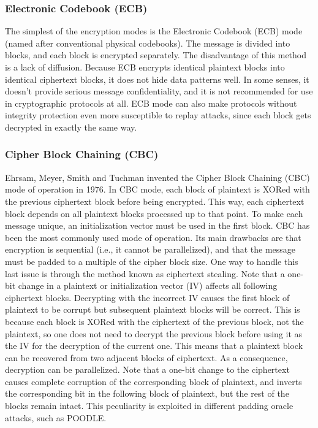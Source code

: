 \documentclass[a4paper, 10pt, titlepage]{article}
\begin{document}
\subsubsection*{Electronic Codebook (ECB)}
The simplest of the encryption modes is the Electronic Codebook (ECB) mode (named after conventional physical codebooks). The message is divided into blocks, and each block is encrypted separately.
The disadvantage of this method is a lack of diffusion. Because ECB encrypts identical plaintext blocks into identical ciphertext blocks, it does not hide data patterns well. In some senses, it doesn't provide serious message confidentiality, and it is not recommended for use in cryptographic protocols at all. ECB mode can also make protocols without integrity protection even more susceptible to replay attacks, since each block gets decrypted in exactly the same way.

\subsubsection*{Cipher Block Chaining (CBC)}
Ehrsam, Meyer, Smith and Tuchman invented the Cipher Block Chaining (CBC) mode of operation in 1976.  In CBC mode, each block of plaintext is XORed with the previous ciphertext block before being encrypted. This way, each ciphertext block depends on all plaintext blocks processed up to that point. To make each message unique, an initialization vector must be used in the first block.
CBC has been the most commonly used mode of operation. Its main drawbacks are that encryption is sequential (i.e., it cannot be parallelized), and that the message must be padded to a multiple of the cipher block size. One way to handle this last issue is through the method known as ciphertext stealing. Note that a one-bit change in a plaintext or initialization vector (IV) affects all following ciphertext blocks. Decrypting with the incorrect IV causes the first block of plaintext to be corrupt but subsequent plaintext blocks will be correct. This is because each block is XORed with the ciphertext of the previous block, not the plaintext, so one does not need to decrypt the previous block before using it as the IV for the decryption of the current one. This means that a plaintext block can be recovered from two adjacent blocks of ciphertext. As a consequence, decryption can be parallelized. Note that a one-bit change to the ciphertext causes complete corruption of the corresponding block of plaintext, and inverts the corresponding bit in the following block of plaintext, but the rest of the blocks remain intact. This peculiarity is exploited in different padding oracle attacks, such as POODLE.
\end{document}
